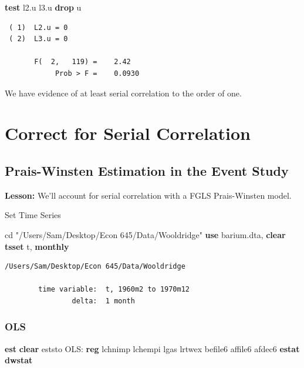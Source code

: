 \documentclass[
]{book}
\newenvironment{Shaded}{\begin{snugshade}}{\end{snugshade}}
\newcommand{\FunctionTok}[1]{\textcolor[rgb]{0.13,0.29,0.53}{\textbf{#1}}}
\newcommand{\KeywordTok}[1]{\textcolor[rgb]{0.13,0.29,0.53}{\textbf{#1}}}
\newcommand{\NormalTok}[1]{#1}
\newcommand{\StringTok}[1]{\textcolor[rgb]{0.31,0.60,0.02}{#1}}
\begin{document}
\begin{Shaded}
\begin{Highlighting}[]
\KeywordTok{test}\NormalTok{ l2.u l3.u}
\KeywordTok{drop}\NormalTok{ u}
\end{Highlighting}
\end{Shaded}

\begin{verbatim}
 ( 1)  L2.u = 0
 ( 2)  L3.u = 0

       F(  2,   119) =    2.42
            Prob > F =    0.0930
\end{verbatim}

We have evidence of at least serial correlation to the order of one.

\chapter{Correct for Serial Correlation}\label{correct-for-serial-correlation}

\section{Prais-Winsten Estimation in the Event Study}\label{prais-winsten-estimation-in-the-event-study}

\textbf{Lesson:} We'll account for serial correlation with a FGLS Prais-Winsten model.

Set Time Series

\begin{Shaded}
\begin{Highlighting}[]
\NormalTok{cd }\StringTok{"/Users/Sam/Desktop/Econ 645/Data/Wooldridge"}
\KeywordTok{use}\NormalTok{ barium.dta, }\KeywordTok{clear}
\KeywordTok{tsset}\NormalTok{ t, }\FunctionTok{monthly}
\end{Highlighting}
\end{Shaded}

\begin{verbatim}
/Users/Sam/Desktop/Econ 645/Data/Wooldridge

        time variable:  t, 1960m2 to 1970m12
                delta:  1 month
\end{verbatim}

\subsection*{OLS}\label{ols}

\begin{Shaded}
\begin{Highlighting}[]
\KeywordTok{est} \KeywordTok{clear}
\NormalTok{eststo OLS: }\KeywordTok{reg}\NormalTok{ lchnimp lchempi lgas lrtwex befile6 affile6 afdec6}
\KeywordTok{estat} \KeywordTok{dwstat}
\end{Highlighting}
\end{Shaded}
\end{document}
